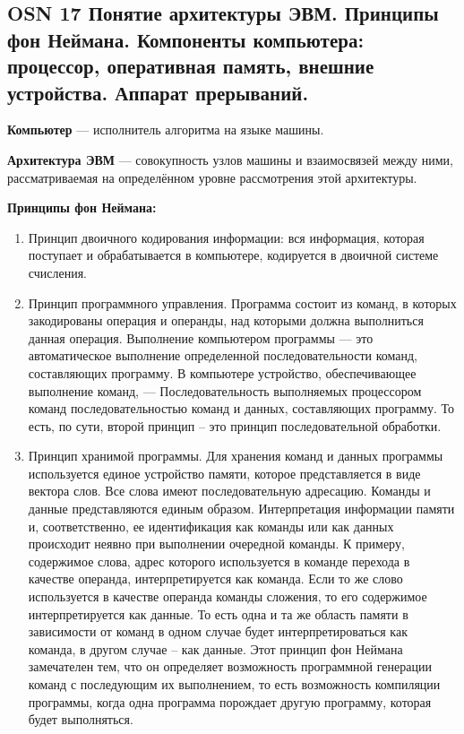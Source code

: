 \subsection{OSN 17 Понятие архитектуры ЭВМ. Принципы фон Неймана. Компоненты компьютера: процессор, оперативная память, внешние устройства. Аппарат прерываний.}


\textbf{Компьютер} --- исполнитель алгоритма на языке машины.

\textbf{Архитектура ЭВМ} --- совокупность узлов машины и взаимосвязей между ними, рассматриваемая на определённом уровне рассмотрения этой архитектуры.

\textbf{Принципы фон Неймана:}
\begin{enumerate}
    \item Принцип двоичного кодирования информации: вся информация, которая поступает и обрабатывается в компьютере, кодируется в двоичной системе счисления.
    \item Принцип программного управления. Программа состоит из команд, в которых закодированы операция и операнды, над которыми должна выполниться данная операция. Выполнение компьютером программы — это автоматическое выполнение определенной последовательности команд, составляющих программу. В компьютере устройство, обеспечивающее выполнение команд, — Последовательность выполняемых процессором команд последовательностью команд и данных, составляющих программу. То есть, по сути, второй принцип – это принцип последовательной обработки.
    \item Принцип хранимой программы. Для хранения команд и данных программы используется единое устройство памяти, которое представляется в виде вектора слов. Все слова имеют последовательную адресацию. Команды и данные представляются единым образом. Интерпретация информации памяти и, соответственно, ее идентификация как команды или как данных происходит неявно при выполнении очередной команды. К примеру, содержимое слова, адрес которого используется в команде перехода в качестве операнда, интерпретируется как команда. Если то же слово используется в качестве операнда команды сложения, то его содержимое интерпретируется как данные. То есть одна и та же область памяти в зависимости от команд в одном случае будет интерпретироваться как команда, в другом случае – как данные. Этот принцип фон Неймана замечателен тем, что он определяет возможность программной генерации команд с последующим их выполнением, то есть возможность компиляции программы, когда одна программа порождает другую программу, которая будет выполняться.
\end{enumerate}

